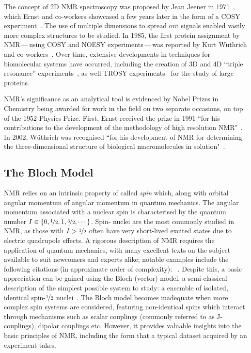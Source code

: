 The concept of \ac{2D} \ac{NMR} spectroscopy was proposed by Jean Jeener in
1971~\cite{Jeener1971, Jeener2016}, which Ernst and co-workers showcased a few
years later in the form of a \ac{COSY} experiment~\cite{Aue1976a}. The use of
multiple dimensions to spread out signals enabled vastly more complex
structures to be studied. In 1985, the first protein assignment by
\ac{NMR}\,---\,using \ac{COSY} and \ac{NOESY} experiments\,---\,was reported
by Kurt W\"uthrich and co-workers~\cite{Williamson1985}. Over time, extensive
developments in techniques for biomolecular systems have occurred, including
the creation of 3D and 4D ``triple resonance'' experiments~\cite{Marion1989,
Kay1990}, as well \ac{TROSY} experiments~\cite{Pervushin1997} for the study of
large proteins.

\ac{NMR}'s significance as an analytical tool is evidenced by Nobel Prizes in
Chemistry being awarded for work in the field on two separate occasions, on top
of the 1952 Physics Prize. First,
Ernst received the prize in 1991 ``for his contributions to the development of
the methodology of high resolution \acl{NMR}"~\cite{Ernst1992}. In 2002,
W\"uthrich was recognised ``for his development of \acl{NMR} for determining
the three-dimensional structure of biological macromolecules in
solution"~\cite{Wuthrich2003}.

\subsection{The Bloch Model}

\ac{NMR} relies on an intrinsic property of \label{corr:prot-neut} called \textit{spin}
which, along with orbital angular momentum \label{corr:mol-rot} of angular momentum in quantum mechanics.
The angular momentum associated with a nuclear spin is characterised by the
quantum number $I \in \lbrace 0, \nicefrac{1}{2}, 1, \nicefrac{3}{2}, \cdots
\rbrace$. Spin-
nuclei are the most commonly studied in \ac{NMR}, as those with $I >
\nicefrac{1}{2}$ often have very short-lived excited states due to electric
quadrupole effects. A rigorous description of \ac{NMR} requires the application
of quantum mechanics, with many excellent texts on the subject available to
suit newcomers and experts alike; notable examples include the
following citations (in approximate order of complexity):
~\cite{Hore2015,Levitt2007,Cavanagh2007,Goldman1988,Abragam1961,Kuprov2023}.
Despite this, a basic
appreciation can be gained using the Bloch (vector) model, a semi-classical
description of the simplest possible system to study: a ensemble of
isolated, identical spin-$\nicefrac{1}{2}$ nuclei~\cite[Chapter 1]{Hore2015}.
The Bloch model becomes inadequate when more complex spin systems are
considered, featuring non-identical spins which interact through mechanisms
such as scalar couplings (commonly referred to as J-couplings), dipolar
couplings etc. However, it provides valuable insights into the basic principles
of \ac{NMR}, including the form that a typical dataset acquired by an
experiment takes.

